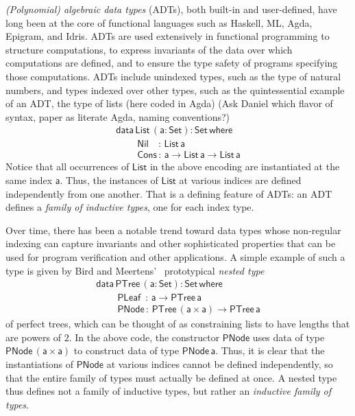 \documentclass[acmsmall,screen,review,anonymous]{acmart}
\theoremstyle{definition}
\begin{document}
\emph{(Polynomial) algebraic data types} (ADTs), both built-in and user-defined,
have long been at the core of functional languages such as Haskell, ML, Agda, Epigram, and Idris.
ADTs are used extensively in functional programming to structure computations,
to express invariants of the data over which computations are defined,
and to ensure the type safety of programs specifying those computations.
ADTs include unindexed types, such as the type of natural numbers,
and types indexed over other types, such as the quintessential example of an ADT,
the type of lists (here coded in Agda)
{\color{blue}(Ask Daniel which flavor of syntax, paper as literate Agda, naming conventions?)}
\begin{equation}\label{eq:list}
\begin{array}{l}
\mathsf{data\, List\,(a : Set) : Set\,where}\\
\mathsf{\;\;\;\;\;\;\;\;Nil\,\,\,\,\,\, :\, List\,a}\\
\mathsf{\;\;\;\;\;\;\;\;Cons\, :\, a \to List\,a \to List\,a} 
\end{array}
\end{equation}
Notice that all occurrences of $\mathsf{List}$ in the above encoding are instantiated at the same index $\mathsf{a}$.
Thus, the instances of $\mathsf{List}$ at various indices are defined independently from one another.
That is a defining feature of ADTs:
an ADT defines a \emph{family of inductive types}, one for each index type.

Over time, there has been a notable trend toward data types
whose non-regular indexing can capture invariants and other sophisticated properties
that can be used for program verification and other applications.
A simple example of such a type is given by Bird and Meertens’~\cite{bm98} prototypical \emph{nested type}
\begin{equation}\label{eq:ptree}
\begin{array}{l}
\mathsf{data\, PTree\,(a : Set) : Set\,where}\\
\mathsf{\;\;\;\;\;\;\;\;PLeaf\,\,\, :\, a \to PTree\,a}\\
\mathsf{\;\;\;\;\;\;\;\;PNode\, :\, PTree\,(a \times a) \to PTree\,a} 
\end{array}
\end{equation}
of perfect trees, which can be thought of as constraining lists to have lengths that are powers of 2.
In the above code, the constructor $\mathsf{PNode}$ uses data of type $\mathsf{PNode\,(a \times a)}$ to construct data of type $\mathsf{PNode\,a}$.
Thus, it is clear that the instantiations of $\mathsf{PNode}$ at various indices cannot be defined independently, so that the entire family of types must actually be defined at once.
A nested type thus defines not a family of inductive types, but rather an \emph{inductive family of types}.
\end{document}
